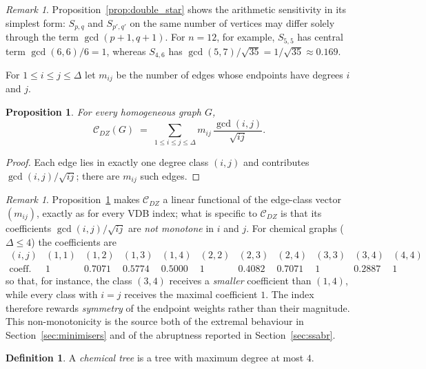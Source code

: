 \documentclass[11pt,a4paper]{article}
\theoremstyle{plain}
\newtheorem{proposition}[theorem]{Proposition}
\theoremstyle{definition}
\newtheorem{definition}[theorem]{Definition}
\theoremstyle{remark}
\newtheorem{remark}[theorem]{Remark}
\newcommand{\CDZ}{\mathcal{C}_{DZ}}
\newcommand{\gcdd}{\operatorname{gcd}}
\begin{document}
\begin{remark}
Proposition~\ref{prop:double_star} shows the arithmetic sensitivity in its
simplest form: $S_{p,q}$ and $S_{p',q'}$ on the same number of vertices may
differ solely through the term $\gcdd(p+1,q+1)$. For $n=12$, for example,
$S_{5,5}$ has central term $\gcdd(6,6)/6=1$, whereas $S_{4,6}$ has
$\gcdd(5,7)/\sqrt{35}=1/\sqrt{35}\approx0.169$.
\end{remark}

For $1\le i\le j\le\Delta$ let $m_{ij}$ be the number of edges whose endpoints
have degrees $i$ and $j$.

\begin{proposition}
\label{prop:degree_class}
For every homogeneous graph $G$,
\[
  \CDZ(G)\;=\;\sum_{1\le i\le j\le\Delta}m_{ij}\,\frac{\gcdd(i,j)}{\sqrt{ij}} .
\]
\end{proposition}

\begin{proof}
Each edge lies in exactly one degree class $(i,j)$ and contributes
$\gcdd(i,j)/\sqrt{ij}$; there are $m_{ij}$ such edges.
\end{proof}

\begin{remark}
\label{rem:nonmonotone}
Proposition~\ref{prop:degree_class} makes $\CDZ$ a linear functional of the
edge-class vector $(m_{ij})$, exactly as for every VDB index; what is specific to
$\CDZ$ is that its coefficients $\gcdd(i,j)/\sqrt{ij}$ are \emph{not monotone} in
$i$ and $j$. For chemical graphs ($\Delta\le4$) the coefficients are
\[
\begin{array}{c|cccccccccc}
(i,j) & (1,1) & (1,2) & (1,3) & (1,4) & (2,2) & (2,3) & (2,4) & (3,3) & (3,4) & (4,4)\\\hline
\text{coeff.} & 1 & 0.7071 & 0.5774 & 0.5000 & 1 & 0.4082 & 0.7071 & 1 & 0.2887 & 1
\end{array}
\]
so that, for instance, the class $(3,4)$ receives a \emph{smaller} coefficient
than $(1,4)$, while every class with $i=j$ receives the maximal coefficient $1$.
The index therefore rewards \emph{symmetry} of the endpoint weights rather than
their magnitude. This non-monotonicity is the source both of the extremal
behaviour in Section~\ref{sec:minimisers} and of the abruptness reported in
Section~\ref{sec:ssabr}.
\end{remark}

\begin{definition}
A \emph{chemical tree} is a tree with maximum degree at most $4$.
\end{definition}
\end{document}
